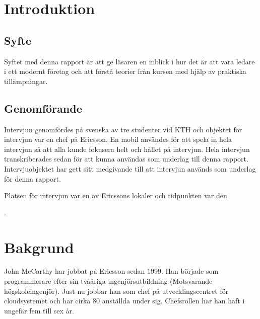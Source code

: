 \section{Introduktion}
\subsection{Syfte}
Syftet med denna rapport är att ge läsaren en inblick i hur det är att vara ledare i ett modernt företag och att förstå teorier från kursen med hjälp av praktiska tillämpningar.

\subsection{Genomförande}
Intervjun genomfördes på svenska av tre studenter vid KTH och objektet för intervjun var en chef på Ericsson. En mobil användes för att spela in hela intervjun så att alla kunde fokusera helt och hållet på intervjun. Hela intervjun transkriberades sedan för att kunna användas som underlag till denna rapport. Intervjuobjektet har gett sitt medgivande till att intervjun används som underlag för denna rapport.

Platsen för intervjun var en av Ericssons lokaler och tidpunkten var den \date{28 april, 2014}.

\section{Bakgrund}
\label{sec:bakgrund}

John McCarthy har jobbat på Ericsson sedan 1999. Han började som programmerare efter sin tvååriga ingenjörsutbildning (Motsvarande högskoleingenjör). Just nu jobbar han som chef på utvecklingscentret för cloudsystemet och har cirka 80 anställda under sig. Chefsrollen har han haft i ungefär fem till sex år.